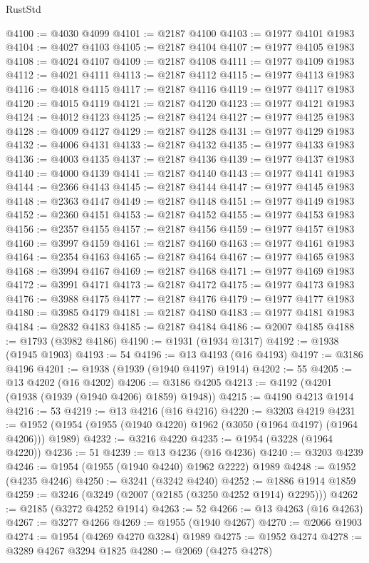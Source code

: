 \begin{lexlean}{RustStd}
\begin{coremodule}
@4100 := @4030 @4099
@4101 := @2187 @4100
@4103 := @1977 @4101 @1983
@4104 := @4027 @4103
@4105 := @2187 @4104
@4107 := @1977 @4105 @1983
@4108 := @4024 @4107
@4109 := @2187 @4108
@4111 := @1977 @4109 @1983
@4112 := @4021 @4111
@4113 := @2187 @4112
@4115 := @1977 @4113 @1983
@4116 := @4018 @4115
@4117 := @2187 @4116
@4119 := @1977 @4117 @1983
@4120 := @4015 @4119
@4121 := @2187 @4120
@4123 := @1977 @4121 @1983
@4124 := @4012 @4123
@4125 := @2187 @4124
@4127 := @1977 @4125 @1983
@4128 := @4009 @4127
@4129 := @2187 @4128
@4131 := @1977 @4129 @1983
@4132 := @4006 @4131
@4133 := @2187 @4132
@4135 := @1977 @4133 @1983
@4136 := @4003 @4135
@4137 := @2187 @4136
@4139 := @1977 @4137 @1983
@4140 := @4000 @4139
@4141 := @2187 @4140
@4143 := @1977 @4141 @1983
@4144 := @2366 @4143
@4145 := @2187 @4144
@4147 := @1977 @4145 @1983
@4148 := @2363 @4147
@4149 := @2187 @4148
@4151 := @1977 @4149 @1983
@4152 := @2360 @4151
@4153 := @2187 @4152
@4155 := @1977 @4153 @1983
@4156 := @2357 @4155
@4157 := @2187 @4156
@4159 := @1977 @4157 @1983
@4160 := @3997 @4159
@4161 := @2187 @4160
@4163 := @1977 @4161 @1983
@4164 := @2354 @4163
@4165 := @2187 @4164
@4167 := @1977 @4165 @1983
@4168 := @3994 @4167
@4169 := @2187 @4168
@4171 := @1977 @4169 @1983
@4172 := @3991 @4171
@4173 := @2187 @4172
@4175 := @1977 @4173 @1983
@4176 := @3988 @4175
@4177 := @2187 @4176
@4179 := @1977 @4177 @1983
@4180 := @3985 @4179
@4181 := @2187 @4180
@4183 := @1977 @4181 @1983
@4184 := @2832 @4183
@4185 := @2187 @4184
@4186 := @2007 @4185
@4188 := @1793 (@3982 @4186)
@4190 := @1931 (@1934 @1317)
@4192 := @1938 (@1945 @1903)
@4193 := 54
@4196 := @13 @4193 (@16 @4193)
@4197 := @3186 @4196
@4201 := @1938 (@1939 (@1940 @4197) @1914)
@4202 := 55
@4205 := @13 @4202 (@16 @4202)
@4206 := @3186 @4205
@4213 := @4192 (@4201 (@1938 (@1939 (@1940 @4206) @1859) @1948))
@4215 := @4190 @4213 @1914
@4216 := 53
@4219 := @13 @4216 (@16 @4216)
@4220 := @3203 @4219
@4231 := @1952 (@1954 (@1955 (@1940 @4220) @1962 (@3050 (@1964 @4197) (@1964 @4206))) @1989)
@4232 := @3216 @4220
@4235 := @1954 (@3228 (@1964 @4220))
@4236 := 51
@4239 := @13 @4236 (@16 @4236)
@4240 := @3203 @4239
@4246 := @1954 (@1955 (@1940 @4240) @1962 @2222) @1989
@4248 := @1952 (@4235 @4246)
@4250 := @3241 (@3242 @4240)
@4252 := @1886 @1914 @1859
@4259 := @3246 (@3249 (@2007 (@2185 (@3250 @4252 @1914) @2295)))
@4262 := @2185 (@3272 @4252 @1914)
@4263 := 52
@4266 := @13 @4263 (@16 @4263)
@4267 := @3277 @4266
@4269 := @1955 (@1940 @4267)
@4270 := @2066 @1903
@4274 := @1954 (@4269 @4270 @3284) @1989
@4275 := @1952 @4274
@4278 := @3289 @4267 @3294 @1825
@4280 := @2069 (@4275 @4278)

\end{coremodule}
\end{lexlean}
